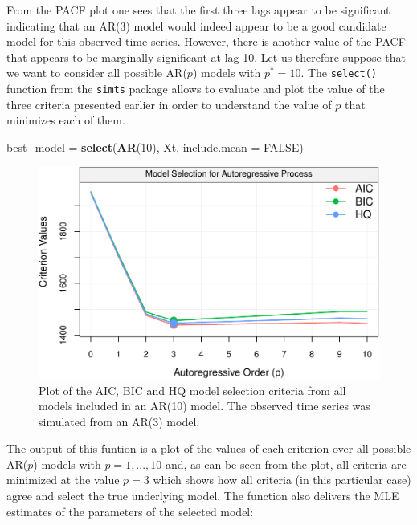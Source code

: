 \documentclass[]{book}
\newenvironment{Shaded}{\begin{snugshade}}{\end{snugshade}}
\newcommand{\KeywordTok}[1]{\textcolor[rgb]{0.13,0.29,0.53}{\textbf{#1}}}
\newcommand{\DataTypeTok}[1]{\textcolor[rgb]{0.13,0.29,0.53}{#1}}
\newcommand{\DecValTok}[1]{\textcolor[rgb]{0.00,0.00,0.81}{#1}}
\newcommand{\StringTok}[1]{\textcolor[rgb]{0.31,0.60,0.02}{#1}}
\newcommand{\OtherTok}[1]{\textcolor[rgb]{0.56,0.35,0.01}{#1}}
\newcommand{\NormalTok}[1]{#1}
\theoremstyle{definition}
\theoremstyle{definition}
\theoremstyle{definition}
\theoremstyle{remark}
\begin{document}
From the PACF plot one sees that the first three lags appear to be
significant indicating that an AR(3) model would indeed appear to be a
good candidate model for this observed time series. However, there is
another value of the PACF that appears to be marginally significant at
lag 10. Let us therefore suppose that we want to consider all possible
AR(\(p\)) models with \(p^* = 10\). The \texttt{select()} function from
the \texttt{simts} package allows to evaluate and plot the value of the
three criteria presented earlier in order to understand the value of
\(p\) that minimizes each of them.

\begin{Shaded}
\begin{Highlighting}[]
\NormalTok{best_model =}\StringTok{ }\KeywordTok{select}\NormalTok{(}\KeywordTok{AR}\NormalTok{(}\DecValTok{10}\NormalTok{), Xt, }\DataTypeTok{include.mean =} \OtherTok{FALSE}\NormalTok{) }
\end{Highlighting}
\end{Shaded}

\begin{figure}

{\centering \includegraphics{ts_files/figure-latex/unnamed-chunk-52-1} 

}

\caption{Plot of the AIC, BIC and HQ model selection criteria from all models included in an AR(10) model. The observed time series was simulated from an AR(3) model.}\label{fig:unnamed-chunk-52}
\end{figure}

The output of this funtion is a plot of the values of each criterion
over all possible AR(\(p\)) models with \(p = 1,...,10\) and, as can be
seen from the plot, all criteria are minimized at the value \(p=3\)
which shows how all criteria (in this particular case) agree and select
the true underlying model. The function also delivers the MLE estimates
of the parameters of the selected model:
\end{document}
